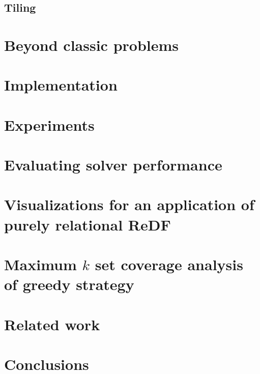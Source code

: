 \subsection{Tiling}
\label{subsection:tiling}

\section{Beyond classic problems}
\label{subsection:beoynd}


\section{Implementation}
\label{section:implementation}


\section{Experiments}
\label{section:experiments}


\section{Evaluating solver performance}  \label{subsec:evaluatingsolver}


\section{Visualizations for an application of purely relational ReDF}\label{appendix:application_purel_relational}

\section{Maximum $k$ set coverage analysis of greedy strategy}\label{appendix:k_set_coverage_analysis}


\section{Related work}
\label{section:related_work}

\section{Conclusions}
\label{section:discussion}


\cleardoublepage

